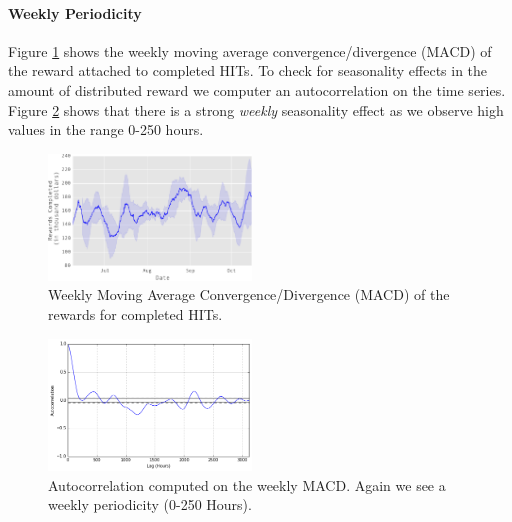 \paragraph{Weekly Periodicity}
Figure \ref{fig:mac} shows the weekly moving average convergence/divergence (MACD) of the reward attached to completed HITs. To check for seasonality effects in the amount of distributed reward we computer an autocorrelation on the time series. Figure \ref{fig:autocorrelation2} shows that there is a strong \emph{weekly} seasonality effect as we observe high values in the range 0-250 hours.
\begin{figure}[tb]
	\centering
		\includegraphics[width=0.48\textwidth]{figures/mac}
	\caption{Weekly Moving Average Convergence/Divergence (MACD) of the rewards for completed HITs.}
	\label{fig:mac}
\end{figure}
\begin{figure}[tb]
	\centering
		\includegraphics[width=0.48\textwidth]{figures/autocorrelation2}
	\caption{Autocorrelation computed on the weekly MACD. Again we see a weekly periodicity (0-250 Hours).}
	\label{fig:autocorrelation2}
\end{figure}